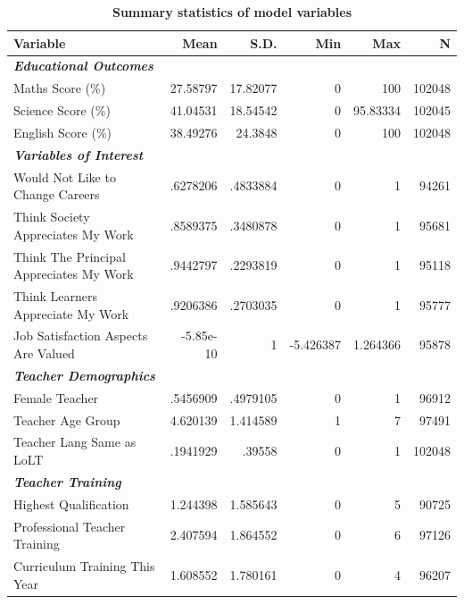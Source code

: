 \documentclass[12pt,preprint, authoryear]{article}
\numberwithin{equation}{section}
\numberwithin{figure}{section}
\numberwithin{table}{section}
\begin{document}
\begin{longtable}[htbp] {@{} l r r r r r @{}} \caption{
\textbf{Summary statistics of model variables}} \label{tab:Desc}  \\ \hline\hline
                \textbf{Variable } & \textbf{Mean} & \textbf{S.D.} & \textbf{Min} & \textbf{Max} & \textbf{N}\\
\hline
\bf{\emph{Educational Outcomes}} & & & & \\
   Maths Score (\%)  &   27.58797 &   17.82077 &          0 &        100 &     102048 \\
   Science Score (\%) &   41.04531 &   18.54542 &          0 &   95.83334 &     102045 \\
   English Score (\%) &   38.49276 &    24.3848 &          0 &        100 &     102048 \\
\bf{\emph{Variables of Interest}} & & & & \\
     Would Not Like to Change Careers   &   .6278206 &   .4833884 &          0 &          1 &      94261 \\
    Think Society Appreciates My Work  &   .8589375 &   .3480878 &          0 &          1 &      95681 \\
     Think The Principal Appreciates My Work  &   .9442797 &   .2293819 &          0 &          1 &      95118 \\
    Think Learners Appreciate My Work  &   .9206386 &   .2703035 &          0 &          1 &      95777 \\
  Job Satisfaction Aspects Are Valued  &   -5.85e-10 &          1 & -5.426387  &   1.264366 &      95878 \\
  \bf{\emph{Teacher Demographics}} & & & & \\
       Female Teacher  &   .5456909 &   .4979105 &          0 &          1 &      96912 \\
       Teacher Age Group  &   4.620139 &    1.414589 &          1 &          7 &      97491 \\
    Teacher Lang Same as LoLT   &   .1941929 &     .39558 &          0 &          1 &     102048 \\
  \bf{\emph{Teacher Training}} & & & & \\
      Highest Qualification  &   1.244398 &   1.585643 &          0 &          5 &      90725 \\
       Professional Teacher Training  &   2.407594 &   1.864552 &          0 &          6 &      97126 \\
       Curriculum Training This Year  &   1.608552 &   1.780161 &          0 &          4 &      96207 \\

\end{longtable}
\end{document}
